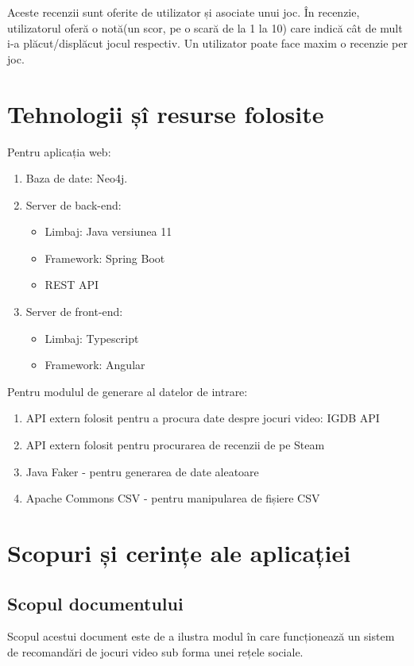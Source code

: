 \documentclass[12pt,a4paper]{report}
\begin{document}
Aceste recenzii sunt oferite de utilizator și asociate unui joc. În recenzie, utilizatorul oferă o notă(un scor, pe o scară de la 1 la 10) care indică cât de mult i-a plăcut/displăcut jocul respectiv. Un utilizator poate face maxim o recenzie per joc.
\section{Tehnologii șî resurse folosite}

Pentru aplicația web:

\begin{enumerate}
  \item Baza de date: Neo4j.
  \item Server de back-end:
  \begin{itemize}
     \item Limbaj: Java versiunea 11
     \item Framework: Spring Boot
     \item REST API
   \end{itemize}
  \item Server de front-end:
  \begin{itemize}
     \item Limbaj: Typescript
     \item Framework: Angular
   \end{itemize}
\end{enumerate}
Pentru modulul de generare al datelor de intrare:

\begin{enumerate}
  \item API extern folosit pentru a procura date despre jocuri video: IGDB API \cite{1}
  \item API extern folosit pentru procurarea de recenzii de pe Steam \cite{2}
  \item Java Faker - pentru generarea de date aleatoare \cite{3}
  \item Apache Commons CSV - pentru manipularea de fișiere CSV \cite{4}
\end{enumerate}


\section{Scopuri și cerințe ale aplicației}
\subsection{Scopul documentului}
Scopul acestui document este de a ilustra modul în care funcționează un sistem de recomandări de jocuri video sub forma unei rețele sociale.
\end{document}
